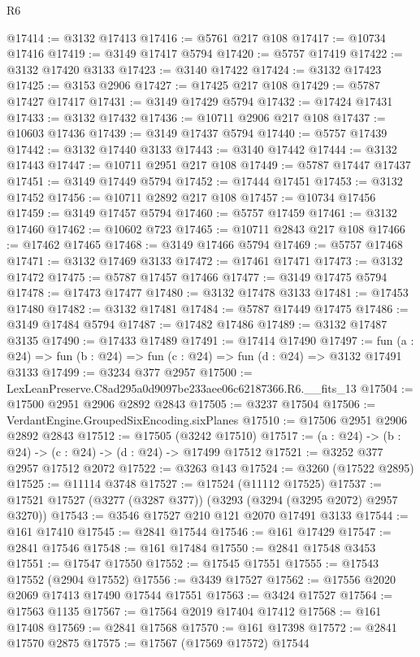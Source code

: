 \begin{lexlean}{R6}
\begin{coremodule}
@17414 := @3132 @17413
@17416 := @5761 @217 @108
@17417 := @10734 @17416
@17419 := @3149 @17417 @5794
@17420 := @5757 @17419
@17422 := @3132 @17420 @3133
@17423 := @3140 @17422
@17424 := @3132 @17423
@17425 := @3153 @2906
@17427 := @17425 @217 @108
@17429 := @5787 @17427 @17417
@17431 := @3149 @17429 @5794
@17432 := @17424 @17431
@17433 := @3132 @17432
@17436 := @10711 @2906 @217 @108
@17437 := @10603 @17436
@17439 := @3149 @17437 @5794
@17440 := @5757 @17439
@17442 := @3132 @17440 @3133
@17443 := @3140 @17442
@17444 := @3132 @17443
@17447 := @10711 @2951 @217 @108
@17449 := @5787 @17447 @17437
@17451 := @3149 @17449 @5794
@17452 := @17444 @17451
@17453 := @3132 @17452
@17456 := @10711 @2892 @217 @108
@17457 := @10734 @17456
@17459 := @3149 @17457 @5794
@17460 := @5757 @17459
@17461 := @3132 @17460
@17462 := @10602 @723
@17465 := @10711 @2843 @217 @108
@17466 := @17462 @17465
@17468 := @3149 @17466 @5794
@17469 := @5757 @17468
@17471 := @3132 @17469 @3133
@17472 := @17461 @17471
@17473 := @3132 @17472
@17475 := @5787 @17457 @17466
@17477 := @3149 @17475 @5794
@17478 := @17473 @17477
@17480 := @3132 @17478 @3133
@17481 := @17453 @17480
@17482 := @3132 @17481
@17484 := @5787 @17449 @17475
@17486 := @3149 @17484 @5794
@17487 := @17482 @17486
@17489 := @3132 @17487 @3135
@17490 := @17433 @17489
@17491 := @17414 @17490
@17497 := fun (a : @24) => fun (b : @24) => fun (c : @24) => fun (d : @24) => @3132 @17491 @3133
@17499 := @3234 @377 @2957
@17500 := LexLeanPreserve.C8ad295a0d9097be233aee06c62187366.R6.__fits_13
@17504 := @17500 @2951 @2906 @2892 @2843
@17505 := @3237 @17504
@17506 := VerdantEngine.GroupedSixEncoding.sixPlanes
@17510 := @17506 @2951 @2906 @2892 @2843
@17512 := @17505 (@3242 @17510)
@17517 := (a : @24) -> (b : @24) -> (c : @24) -> (d : @24) -> @17499 @17512
@17521 := @3252 @377 @2957 @17512 @2072
@17522 := @3263 @143
@17524 := @3260 (@17522 @2895)
@17525 := @11114 @3748
@17527 := @17524 (@11112 @17525)
@17537 := @17521 @17527 (@3277 (@3287 @377)) (@3293 (@3294 (@3295 @2072) @2957 @3270))
@17543 := @3546 @17527 @210 @121 @2070 @17491 @3133
@17544 := @161 @17410
@17545 := @2841 @17544
@17546 := @161 @17429
@17547 := @2841 @17546
@17548 := @161 @17484
@17550 := @2841 @17548 @3453
@17551 := @17547 @17550
@17552 := @17545 @17551
@17555 := @17543 @17552 (@2904 @17552)
@17556 := @3439 @17527
@17562 := @17556 @2020 @2069 @17413 @17490 @17544 @17551
@17563 := @3424 @17527
@17564 := @17563 @1135
@17567 := @17564 @2019 @17404 @17412
@17568 := @161 @17408
@17569 := @2841 @17568
@17570 := @161 @17398
@17572 := @2841 @17570 @2875
@17575 := @17567 (@17569 @17572) @17544

\end{coremodule}
\end{lexlean}
